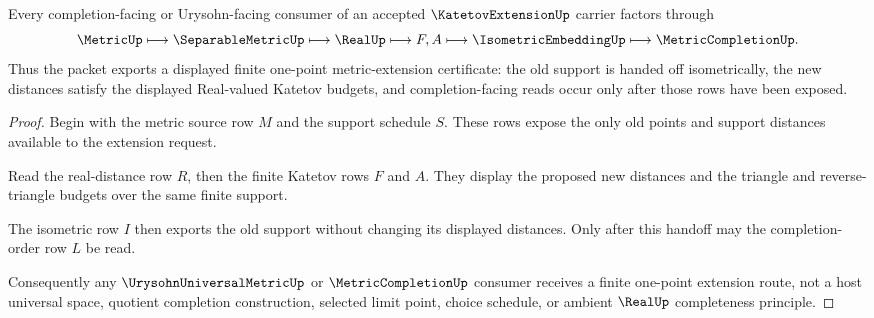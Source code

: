 \begin{theorem}
\label{thm:katetov-extension-isometric-handoff}
Every completion-facing or Urysohn-facing consumer of an accepted $\KatetovExtensionUp$ carrier factors through
$$
\MetricUp \longmapsto \SeparableMetricUp \longmapsto \RealUp \longmapsto F,A \longmapsto \IsometricEmbeddingUp \longmapsto \MetricCompletionUp .
$$
Thus the packet exports a displayed finite one-point metric-extension certificate: the old support is handed off isometrically, the new distances satisfy the displayed Real-valued Katetov budgets, and completion-facing reads occur only after those rows have been exposed.
\end{theorem}
\begin{proof}
Begin with the metric source row $M$ and the support schedule $S$. These rows expose the only old points and support distances available to the extension request.

Read the real-distance row $R$, then the finite Katetov rows $F$ and $A$. They display the proposed new distances and the triangle and reverse-triangle budgets over the same finite support.

The isometric row $I$ then exports the old support without changing its displayed distances. Only after this handoff may the completion-order row $L$ be read.

Consequently any $\UrysohnUniversalMetricUp$ or $\MetricCompletionUp$ consumer receives a finite one-point extension route, not a host universal space, quotient completion construction, selected limit point, choice schedule, or ambient $\RealUp$ completeness principle.
\end{proof}



